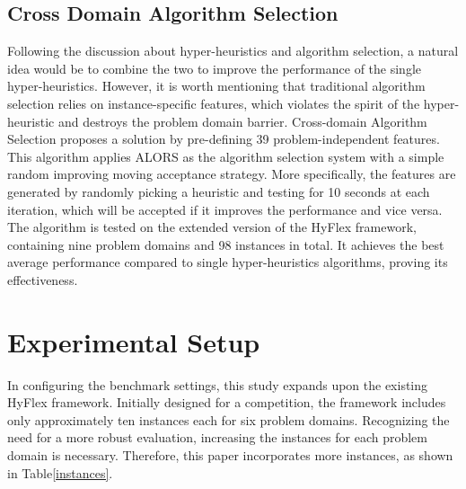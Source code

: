 \documentclass[preprint,review,12pt]{elsarticle}
\begin{document}
\subsection{Cross Domain Algorithm Selection}
Following the discussion about hyper-heuristics and algorithm selection, a natural idea would be to combine the two to improve the performance of the single hyper-heuristics. However, it is worth mentioning that traditional algorithm selection relies on instance-specific features, which violates the spirit of the hyper-heuristic and destroys the problem domain barrier. 
Cross-domain Algorithm Selection\cite{misir2022cross}  proposes a solution by pre-defining 39 problem-independent features\cite{misir2012intelligent}\cite{misir2015oscar}. This algorithm applies ALORS as the algorithm selection system with a simple random improving moving acceptance strategy. More specifically, the features are generated by randomly picking a heuristic and testing for 10 seconds at each iteration, which will be accepted if it improves the performance and vice versa. The algorithm is tested on the extended version of the HyFlex framework, containing nine problem domains and 98 instances in total. It achieves the best average performance compared to single hyper-heuristics algorithms, proving its effectiveness.



\section{Experimental Setup}
\label{sec:intro}
In configuring the benchmark settings, this study expands upon the existing HyFlex framework. Initially designed for a competition, the framework includes only approximately ten instances each for six problem domains. Recognizing the need for a more robust evaluation, increasing the instances for each problem domain is necessary. Therefore, this paper incorporates more instances, as shown in Table\ref{instances}. 
\end{document}
